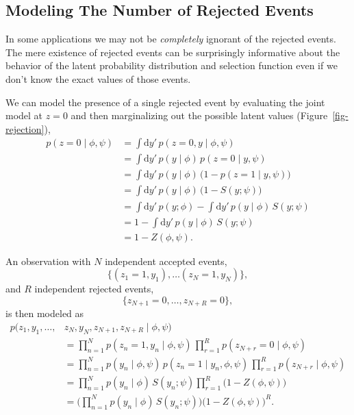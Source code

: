 \documentclass[
  letterpaper,
  DIV=11,
  numbers=noendperiod]{scrartcl}
\begin{document}
\subsection{Modeling The Number of Rejected
Events}\label{modeling-the-number-of-rejected-events}

In some applications we may not be \emph{completely} ignorant of the
rejected events. The mere existence of rejected events can be
surprisingly informative about the behavior of the latent probability
distribution and selection function even if we don't know the exact
values of those events.

We can model the presence of a single rejected event by evaluating the
joint model at \(z = 0\) and then marginalizing out the possible latent
values (Figure~\ref{fig-rejection}), \begin{align*}
p(z = 0 \mid \phi, \psi)
&= \int \mathrm{d} y' \, p(z = 0, y \mid \phi, \psi)
\\
&= \int \mathrm{d} y' \, p(y \mid \phi) \, p(z = 0 \mid y, \psi)
\\
&= \int \mathrm{d} y' \,
   p(y \mid \phi) \, \big( 1 - p(z = 1 \mid y, \psi) \big)
\\
&= \int \mathrm{d} y' \, p(y \mid \phi) \, \big(1 - S(y; \psi) \big)
\\
&=  \int \mathrm{d} y' \, p(y; \phi)
  - \int \mathrm{d} y' \, p(y \mid \phi) \, S(y; \psi)
\\
&= 1 - \int \mathrm{d} y' \, p(y \mid \phi) \, S(y; \psi)
\\
&= 1 - Z(\phi, \psi).
\end{align*}

An observation with \(N\) independent accepted events, \[
\{ (z_{1} = 1, y_{1}), \ldots (z_{N} = 1, y_{N}) \},
\] and \(R\) independent rejected events, \[
\{ z_{N + 1} = 0, \ldots, z_{N + R} = 0 \},
\] is then modeled as \begin{align*}
p( z_{1}, y_{1}, \ldots, &z_{N}, y_{N}, z_{N + 1}, z_{N + R} \mid \phi, \psi)
\\
&=
\prod_{n = 1}^{N} p(z_{n} = 1, y_{n} \mid \phi, \psi) \,
\prod_{r = 1}^{R} p(z_{N + r} = 0 \mid \phi, \psi)
\\
&=
\prod_{n = 1}^{N} p(y_{n} \mid \phi, \psi) \,
                  p(z_{n} = 1 \mid y_{n}, \phi, \psi) \,
\prod_{r = 1}^{R} p(z_{N + r} \mid \phi, \psi)
\\
&=
\prod_{n = 1}^{N} p(y_{n} \mid \phi) \, S(y_{n}; \psi)
\prod_{r = 1}^{R} \big( 1 - Z(\phi, \psi) \big)
\\
&=
\bigg( \prod_{n = 1}^{N} p(y_{n} \mid \phi) \, S(y_{n}; \psi) \bigg)
\bigg( 1 - Z(\phi, \psi) \bigg)^{R}.
\end{align*}
\end{document}
